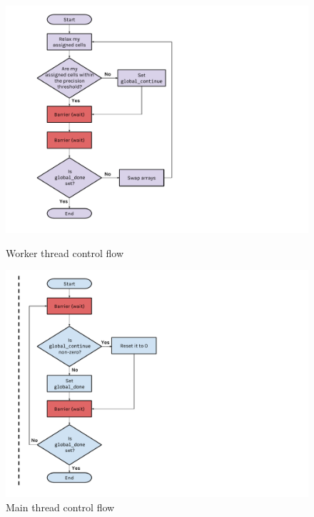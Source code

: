 \documentclass[12pt]{article}
\begin{document}
\begin{figure}[!htb]
    \begin{minipage}{.47\textwidth}
        \hspace{-1.6cm}\includegraphics[width=2.4\textwidth]{img/workersflowchart.pdf}
        \caption{Worker thread control flow}
        \label{fig:workers}
    \end{minipage}\hspace{1.65cm}
    \begin{minipage}{0.47\textwidth}
       \hspace{-1cm}\includegraphics[width=2.4\textwidth]{img/mainflowchart.pdf}
        \caption{Main thread control flow}
        \label{fig:main}
    \end{minipage}
\end{figure}
\end{document}
